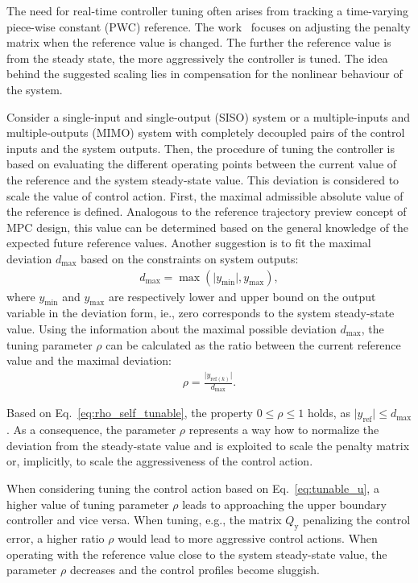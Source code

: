\documentclass[preprint,12pt]{elsarticle}
\begin{document}
	The need for real-time controller tuning often arises from tracking a time-varying piece-wise constant (PWC) reference. The work~\cite{self_tunable} focuses on adjusting the penalty matrix when the reference value is changed. The further the reference value is from the steady state, the more aggressively the controller is tuned. The idea behind the suggested scaling lies in compensation for the nonlinear behaviour of the system.  
	
	Consider a single-input and single-output (SISO) system or a multiple-inputs and multiple-outputs (MIMO) system with completely decoupled pairs of the control inputs and the system outputs. 
	Then, the procedure of tuning the controller is based on evaluating the different operating points between the current value of the reference and the system steady-state value. This deviation is considered to scale the value of control action. First, the maximal admissible absolute value of the reference is defined. Analogous to the reference trajectory preview concept of MPC design, this value can be determined based on the general knowledge of the expected future reference values. Another suggestion is to fit the maximal deviation $d_{\max}$ based on the constraints on system outputs: 
	\begin{eqnarray}
		\label{eq:d_max}
		d_{\max} = \max(\vert y_{\min} \vert, y_{\max}),
	\end{eqnarray}
	where $y_{\min}$ and $y_{\max}$ are respectively lower and upper bound on the output variable in the deviation form, ie., zero corresponds to the system steady-state value. Using the information about the maximal possible deviation $d_{\max}$, the tuning parameter $\rho$ can be calculated as the ratio between the current reference value and the maximal deviation:  
	\begin{eqnarray}
		\label{eq:rho_self_tunable}
		\rho = \frac{\vert y_{\mathrm{ref}(k)} \vert}{d_{\max}}.
	\end{eqnarray}
	
	Based on Eq.~\eqref{eq:rho_self_tunable}, the property $0 \le \rho \le 1$ holds, as $\vert y_{\mathrm{ref}} \vert \le d_{\max}$. As a consequence, the parameter $\rho$ represents a way how to normalize the deviation from the steady-state value and is exploited to scale the penalty matrix or, implicitly, to scale the aggressiveness of the control action. 
	
	When considering tuning the control action based on Eq.~\eqref{eq:tunable_u}, a higher value of tuning parameter $\rho$ leads to approaching the upper boundary controller and vice versa. When tuning, e.g., the matrix $Q_\mathrm{y}$ penalizing the control error, a higher ratio $\rho$ would lead to more aggressive control actions. When operating with the reference value close to the system steady-state value, the parameter $\rho$ decreases and the control profiles become sluggish.
	
\end{document}
